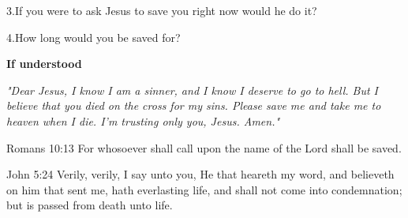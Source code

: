   3.\hspace{0.6em}If you were to ask Jesus to save you right now would he do it?

  4.\hspace{0.6em}How long would you be saved for?

\textbf{If understood}

{\em "Dear Jesus, I know I am a sinner, and I know I deserve to go to hell.  But I
believe that you died on the cross for my sins. Please save me and take me to
heaven when I die. I'm trusting only you, Jesus. Amen." }

Romans 10:13 For whosoever shall call upon the name of the Lord shall be saved.

John 5:24 Verily, verily, I say unto you, He that heareth my word, and
believeth on him that sent me, hath everlasting life, and shall not come into
condemnation; but is passed from death unto life.

